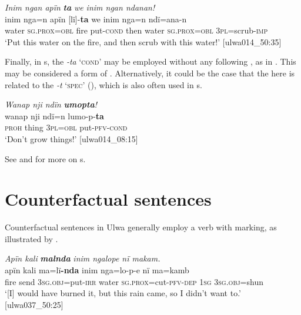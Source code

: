 \ea%
    \label{ex:syntax:264}
          \textit{Inim ngan apïn} \textbf{\textit{ta}} \textit{we inim ngan ndanan!}\\
\gll    inim  nga=n      apïn  [lï]-\textbf{ta}    we    inim  nga=n ndï=ana-n\\
    water  \textsc{sg.prox=obl}  fire    put-\textsc{cond}  then  water  \textsc{sg.prox=obl}    \textsc{3pl}=scrub-\textsc{imp}\\
\glt `Put this water on the fire, and then scrub with this water!’ [ulwa014\_50:35]
\z

Finally, in s, the   \textit{-ta} ‘\textsc{cond}’ may be employed without any following , as in . This may be considered a form of . Alternatively, it could be the case that the  here is related to the   \textit{-t} ‘\textsc{spec}’ (), which is also often used in s.

\ea%
    \label{ex:syntax:265}
          \textit{Wanap nji ndïn} \textbf{\textit{umopta}}\textit{!}\\
\gll    wanap  nji    ndï=n    lumo-p-\textbf{ta}\\
    \textsc{proh}  thing  3\textsc{pl=obl}  put-\textsc{pfv-cond}\\
\glt `Don’t grow things!’ [ulwa014\_08:15]
\z

See  and  for more on s.


\section{Counterfactual sentences}\label{sec:13.6}


Counterfactual sentences in Ulwa generally employ a verb with  marking, as illustrated by .

\ea%
    \label{ex:syntax:266}
          \textit{Apïn kali} \textbf{\textit{malnda}} \textit{inim ngalope nï makam.}\\
\gll    apïn  kali  ma=lï\textbf{{}-nda} inim  nga=lo-p-e        nï ma=kamb\\
    fire    send  3\textsc{sg.obj}=put-\textsc{irr}  water  \textsc{sg.prox}=cut-\textsc{pfv-dep}  1\textsc{sg}         3\textsc{sg.obj}=shun\\
\glt `[I] would have burned it, but this rain came, so I didn’t want to.’ [ulwa037\_50:25]
\z

